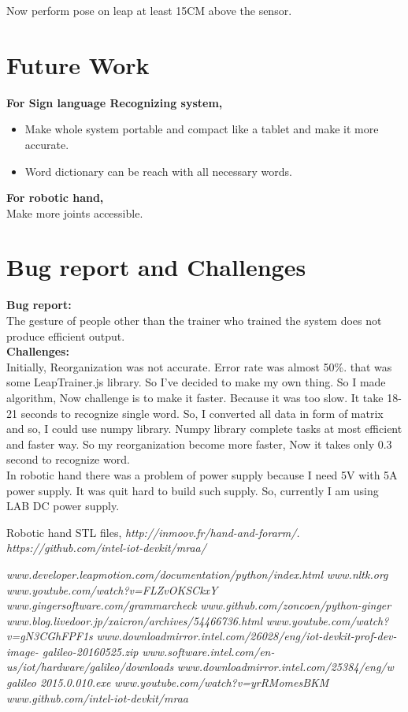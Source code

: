 \documentclass[a4paper,12pt,oneside]{book}
\begin{document}
Now perform pose on leap at least 15CM above the sensor.


\section{Future Work}
\textbf{For Sign language Recognizing system,}\\
\begin{itemize}
\item Make whole system portable and compact like a tablet and make it more accurate.
\item Word dictionary can be reach with all necessary words.
\end{itemize}

\textbf{For robotic hand,}\\
Make more joints accessible.

\section{Bug report and Challenges}
\textbf{Bug report:}\\
The gesture of people other than the trainer who trained the system does not produce efficient output.\\
\textbf{Challenges:}\\
Initially, Reorganization was not accurate. Error rate was almost 50\%. that was some LeapTrainer.js library. So I've decided to make my own thing. So I made algorithm, Now challenge is to make it faster. Because it was too slow. It take 18-21 seconds to recognize single word. So, I converted all data in form of matrix and so, I could use numpy library. Numpy library complete tasks at most efficient and faster way. So my reorganization become more faster, Now it takes only 0.3 second to recognize word.\\
In robotic hand there was a problem of power supply because I need 5V with 5A power supply. It was quit hard to build such supply. So, currently I am using LAB DC power supply.

\begin{thebibliography}{li}
Robotic hand STL files,
{\em http://inmoov.fr/hand-and-forarm/.}
{\em https://github.com/intel-iot-devkit/mraa/}

{\em www.developer.leapmotion.com/documentation/python/index.html}
{\em www.nltk.org}
{\em www.youtube.com/watch?v=FLZvOKSCkxY}
{\em www.gingersoftware.com/grammarcheck}
{\em www.github.com/zoncoen/python-ginger}
{\em www.blog.livedoor.jp/xaicron/archives/54466736.html}
{\em www.youtube.com/watch?v=gN3CGhFPF1s}
{\em www.downloadmirror.intel.com/26028/eng/iot-devkit-prof-dev-image-
galileo-20160525.zip}
{\em www.software.intel.com/en-us/iot/hardware/galileo/downloads}
{\em www.downloadmirror.intel.com/25384/eng/w galileo 2015.0.010.exe}
{\em www.youtube.com/watch?v=yrRMomesBKM}
{\em www.github.com/intel-iot-devkit/mraa}
\end{thebibliography}
\end{document}
